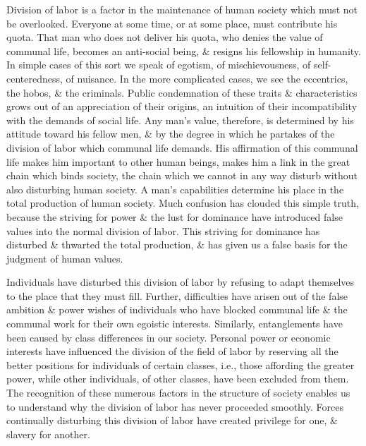 \documentclass{article}
\begin{document}
Division of labor is a factor in the maintenance of human society which must not be overlooked. Everyone at some time, or at some place, must contribute his quota. That man who does not deliver his quota, who denies the value of communal life, becomes an anti-social being, \& resigns his fellowship in humanity. In simple cases of this sort we speak of egotism, of mischievousness, of self-centeredness, of nuisance. In the more complicated cases, we see the eccentrics, the hobos, \& the criminals. Public condemnation of these traits \& characteristics grows out of an appreciation of their origins, an intuition of their incompatibility with the demands of social life. Any man's value, therefore, is determined by his attitude toward his fellow men, \& by the degree in which he partakes of the division of labor which communal life demands. His affirmation of this communal life makes him important to other human beings, makes him a link in the great chain which binds society, the chain which we cannot in any way disturb without also disturbing human society. A man's capabilities determine his place in the total production of human society. Much confusion has clouded this simple truth, because the striving for power \& the lust for dominance have introduced false values into the normal division of labor. This striving for dominance has disturbed \& thwarted the total production, \& has given us a false basis for the judgment of human values.

Individuals have disturbed this division of labor by refusing to adapt themselves to the place that they must fill. Further, difficulties have arisen out of the false ambition \& power wishes of individuals who have blocked communal life \& the communal work for their own egoistic interests. Similarly, entanglements have been caused by class differences in our society. Personal power or economic interests have influenced the division of the field of labor by reserving all the better positions for individuals of certain classes, i.e., those affording the greater power, while other individuals, of other classes, have been excluded from them. The recognition of these numerous factors in the structure of society enables us to understand why the division of labor has never proceeded smoothly. Forces continually disturbing this division of labor have created privilege for one, \& slavery for another.
\end{document}
